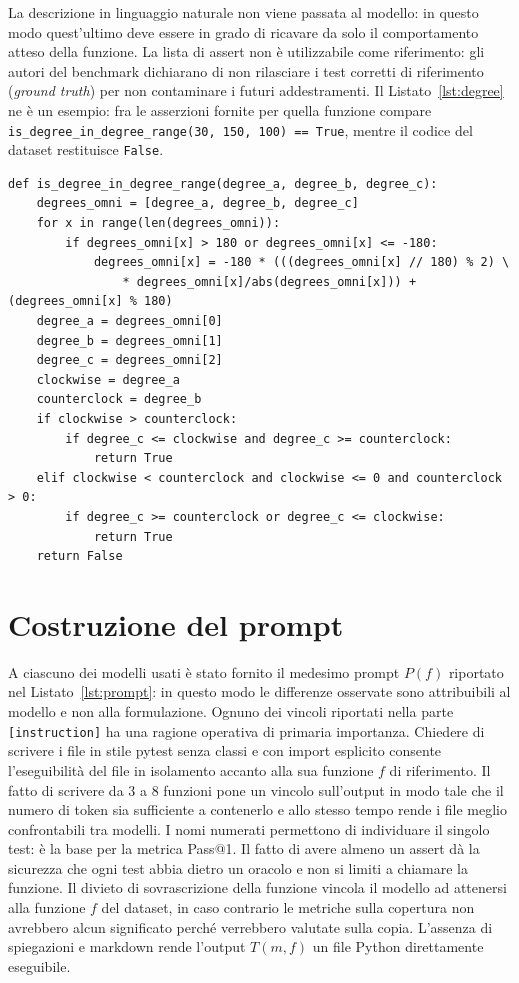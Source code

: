 La descrizione in linguaggio naturale non viene passata al modello: in questo modo quest'ultimo deve essere in grado di ricavare da solo il comportamento atteso della funzione. La lista di assert non è utilizzabile come riferimento: gli autori del benchmark dichiarano di non rilasciare i test corretti di riferimento  (\emph{ground truth}) per non contaminare i futuri addestramenti.
Il Listato~\ref{lst:degree} ne è un esempio: fra le asserzioni fornite per quella funzione compare \texttt{is\_degree\_in\_degree\_range(30, 150, 100) == True},
mentre il codice del dataset restituisce \texttt{False}.

\begin{lstlisting}[float=htbp,
                   caption={Il campione 0 del dataset, \texttt{is\_degree\_in\_degree\_range}.},
                   label={lst:degree}]
def is_degree_in_degree_range(degree_a, degree_b, degree_c):
    degrees_omni = [degree_a, degree_b, degree_c]
    for x in range(len(degrees_omni)):
        if degrees_omni[x] > 180 or degrees_omni[x] <= -180:
            degrees_omni[x] = -180 * (((degrees_omni[x] // 180) % 2) \
                * degrees_omni[x]/abs(degrees_omni[x])) + (degrees_omni[x] % 180)
    degree_a = degrees_omni[0]
    degree_b = degrees_omni[1]
    degree_c = degrees_omni[2]
    clockwise = degree_a
    counterclock = degree_b
    if clockwise > counterclock:
        if degree_c <= clockwise and degree_c >= counterclock:
            return True
    elif clockwise < counterclock and clockwise <= 0 and counterclock > 0:
        if degree_c >= counterclock or degree_c <= clockwise:
            return True
    return False
\end{lstlisting}


\section{Costruzione del prompt}
A ciascuno dei modelli usati è stato fornito il medesimo prompt $P(f)$ riportato nel Listato~\ref{lst:prompt}: in questo modo le differenze osservate sono attribuibili al modello e non alla formulazione. Ognuno dei vincoli riportati nella parte \texttt{[instruction]} ha una ragione operativa di primaria importanza. Chiedere di scrivere i file in stile pytest senza classi e con import esplicito consente l'eseguibilità del file in isolamento accanto alla sua funzione $f$ di riferimento. Il fatto di scrivere da 3 a 8 funzioni pone un vincolo sull'output in modo tale che il numero di token sia sufficiente a contenerlo e allo stesso tempo rende i file meglio confrontabili tra modelli. I nomi numerati permettono di individuare il singolo test: è la base per la metrica Pass@1. Il fatto di avere almeno un assert dà la sicurezza che ogni test abbia dietro un oracolo e non si limiti a chiamare la funzione. Il divieto di sovrascrizione della funzione vincola il modello ad attenersi alla funzione $f$ del dataset, in caso contrario le metriche sulla copertura non avrebbero alcun significato perché verrebbero valutate sulla copia.
L'assenza di spiegazioni e markdown rende l'output $T(m,f)$ un file Python direttamente eseguibile.

